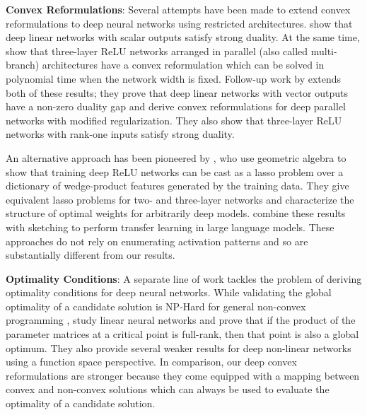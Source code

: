 
\textbf{Convex Reformulations}:
Several attempts have been made to extend convex reformulations to deep
neural networks using restricted architectures.
\citet{ergen2021revealing} show that deep linear networks with scalar outputs
satisfy strong duality.
At the same time, \citet{ergen2021beyond} show that three-layer ReLU
networks arranged in parallel (also called multi-branch)
architectures have a convex reformulation which can be solved in polynomial
time when the network width is fixed.
Follow-up work by \citet{wang2023parallel} extends both of these results;
they prove that deep linear networks with vector outputs have a non-zero
duality gap and derive convex reformulations for deep parallel networks
with modified regularization.
They also show that three-layer ReLU networks with rank-one inputs satisfy
strong duality.

An alternative approach has been pioneered by \citet{pilanci2024clarity}, who
use geometric algebra to show that training deep ReLU networks can be cast as a
lasso problem over a dictionary of wedge-product features generated by the
training data.
They give equivalent lasso problems for two- and three-layer networks and
characterize the structure of optimal weights for arbitrarily deep models.
\citet{wang2024randomized} combine these results with sketching to perform
transfer learning in large language models.
These approaches do not rely on enumerating activation
patterns and so are substantially different from our results.

\textbf{Optimality Conditions}:
A separate line of work tackles the problem of deriving optimality conditions
for deep neural networks.
While validating the global optimality of a candidate solution is NP-Hard
for general non-convex programming \citep{murty1987complete},
\citet{jadbadbaie2018checking} study linear neural networks and prove that if
the product of the parameter matrices at a critical point is full-rank, then 
that point is also a global optimum.
They also provide several weaker results for deep non-linear networks using a
function space perspective.
In comparison, our deep convex reformulations are stronger because they come
equipped with a mapping between convex and non-convex solutions which can
always be used to evaluate the optimality of a candidate solution.

